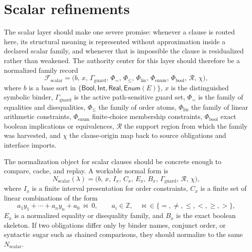 \documentclass[11pt]{report}
\begin{document}
\section{Scalar refinements}
The scalar layer should make one severe promise: whenever a clause is routed here, its structural meaning is represented without approximation inside a declared scalar family, and whenever that is impossible the clause is residualized rather than weakened. The authority center for this layer should therefore be a normalized family record
\[
\mathcal{F}_{\mathrm{scalar}} =
\bigl(
b,\,
x,\,
\Gamma_{\mathrm{guard}},\,
\Phi_{=},\,
\Phi_{\le},\,
\Phi_{\mathrm{lin}},\,
\Phi_{\mathrm{enum}},\,
\Phi_{\mathrm{bool}},\,
\mathcal{R},\,
\chi
\bigr),
\]
where $b$ is a base sort in $\{\mathsf{Bool},\mathsf{Int},\mathsf{Real},\mathsf{Enum}(E)\}$, $x$ is the distinguished symbolic binder, $\Gamma_{\mathrm{guard}}$ is the active path-sensitive guard set, $\Phi_{=}$ is the family of equalities and disequalities, $\Phi_{\le}$ the family of order atoms, $\Phi_{\mathrm{lin}}$ the family of linear arithmetic constraints, $\Phi_{\mathrm{enum}}$ finite-choice membership constraints, $\Phi_{\mathrm{bool}}$ exact boolean implications or equivalences, $\mathcal{R}$ the support region from which the family was harvested, and $\chi$ the clause-origin map back to source obligations and interface imports.

The normalization object for scalar clauses should be concrete enough to compare, cache, and replay. A workable normal form is
\[
N_{\mathrm{scalar}}(\lambda)
=
\bigl(
b,\,
x,\,
I_x,\,
C_x,\,
E_x,\,
B_x,\,
\Gamma_{\mathrm{guard}},\,
\mathcal{R},\,
\chi
\bigr),
\]
where $I_x$ is a finite interval presentation for order constraints, $C_x$ is a finite set of linear combinations of the form
\[
a_1 y_1 + \cdots + a_n y_n + a_0 \;\bowtie\; 0,
\qquad
a_i \in \mathbb{Z},
\quad
\bowtie \in \{=,\neq,\le,<,\ge,>\},
\]
$E_x$ is a normalized equality or disequality family, and $B_x$ is the exact boolean skeleton. If two obligations differ only by binder names, conjunct order, or syntactic sugar such as chained comparisons, they should normalize to the same $N_{\mathrm{scalar}}$.
\end{document}

